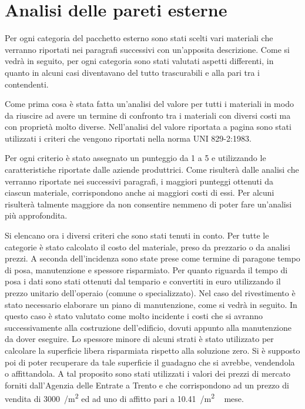 \chapter{Analisi delle pareti esterne}
Per ogni categoria del pacchetto esterno sono stati scelti vari materiali che verranno riportati nei paragrafi successivi con un'apposita descrizione.  
Come si vedrà in seguito, per ogni categoria sono stati valutati aspetti differenti, in quanto in alcuni casi diventavano del tutto trascurabili e alla pari tra i contendenti.

Come prima cosa è stata fatta un'analisi del valore per tutti i materiali in modo da riuscire ad avere un termine di confronto tra i materiali con diversi costi ma con proprietà molto diverse. 
Nell'analisi del valore riportata a pagina \pageref{fig:AnalisiValore} sono stati utilizzati i criteri che vengono riportati nella norma \textsc{UNI 829-2:1983}.

Per ogni criterio è stato assegnato un punteggio da 1 a 5  e utilizzando le caratteristiche riportate dalle aziende produttrici. 
Come risulterà dalle analisi che verranno riportate nei successivi paragrafi, i maggiori punteggi ottenuti da ciascun materiale, corrispondono anche ai maggiori costi di essi.
Per alcuni risulterà talmente maggiore da non consentire nemmeno di poter fare un'analisi più approfondita.

Si elencano ora i diversi criteri che sono stati tenuti in conto.
Per tutte le categorie è stato calcolato il costo del materiale, preso da prezzario o da analisi prezzi.
A seconda dell'incidenza sono state prese come termine di paragone tempo di posa, manutenzione e spessore risparmiato.
Per quanto riguarda il tempo di posa i dati sono stati ottenuti dal tempario \textcite{grosso2007tempario} e convertiti in euro utilizzando il prezzo unitario dell'operaio (comune o specializzato). 
Nel caso del rivestimento è stato necessario elaborare un piano di manutenzione, come si vedrà in seguito. 
In questo caso è stato valutato come molto incidente i costi che si avranno successivamente alla costruzione dell'edificio, dovuti appunto alla manutenzione da dover eseguire.
Lo spessore minore di alcuni strati è stato utilizzato per calcolare la superficie libera risparmiata rispetto alla soluzione zero. 
Si è supposto poi di poter recuperare da tale superficie il guadagno che si avrebbe, vendendola o affittandola.
A tal proposito sono stati utilizzati i valori dei prezzi di mercato forniti dall'Agenzia delle Entrate a Trento e che corrispondono ad un  prezzo di vendita di \SI{3000}{\teuro / \square\metre} ed ad uno di affitto pari a \SI{10.41}{\teuro /\square\metre\, mese}.